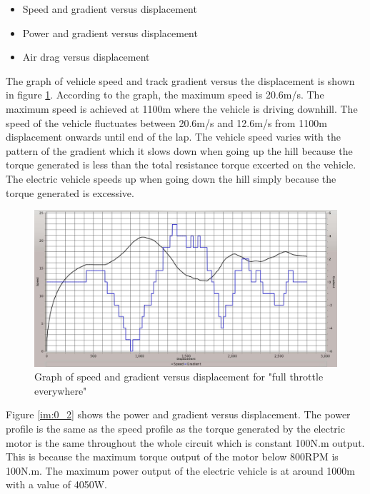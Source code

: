 \begin{itemize}
	\item{Speed and gradient versus displacement}
	\item{Power and gradient versus displacement}
	\item{Air drag versus displacement}
\end{itemize}

The graph of vehicle speed and track gradient versus the displacement is shown in figure \ref{im:0_1}. According to the graph, the maximum speed is 20.6m/s. The maximum speed is achieved at 1100m where the vehicle is driving downhill. The speed of the vehicle fluctuates between 20.6m/s and 12.6m/s from 1100m displacement onwards until end of the lap. The vehicle speed varies with the pattern of the gradient which it slows down when going up the hill because the torque generated is less than the total resistance torque excerted on the vehicle. The electric vehicle speeds up when going down the hill simply because the torque generated is excessive.

\begin{figure}[htb]
	\centering
	\includegraphics[width=6in]{images/0_1.jpg}
	\caption{Graph of speed and gradient versus displacement for "full throttle everywhere"}
	\label{im:0_1}
\end{figure}

Figure \ref{im:0_2} shows the power and gradient versus displacement. The power profile is the same as the speed profile as the torque generated by the electric motor is the same throughout the whole circuit which is constant 100N.m output. This is because the maximum torque output of the motor below 800RPM is 100N.m. The maximum power output of the electric vehicle is at around 1000m with a value of 4050W. 

